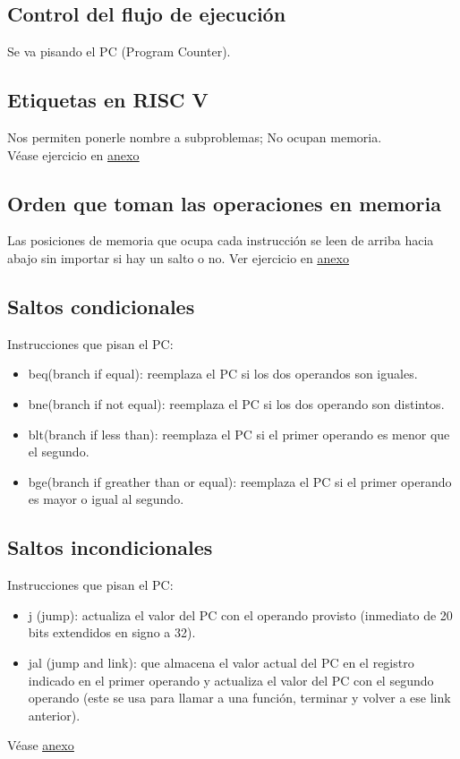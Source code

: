 \documentclass[10pt,a4paper]{article}
\begin{document}
\subsection*{Control del flujo de ejecución}
Se va pisando el PC (Program Counter). 
\subsection*{Etiquetas en RISC V}
Nos permiten ponerle nombre a subproblemas; No ocupan memoria. \\

Véase ejercicio en \hyperref[subsec:ejercicios_con_saltos_condicionales_incondicionales]{\underline{anexo}}
\subsection*{Orden que toman las operaciones en memoria}
Las posiciones de memoria que ocupa cada instrucción se leen de arriba hacia abajo sin importar si hay un salto o no.
Ver ejercicio en \hyperref[subsec:TPRVC]{\underline{anexo}} 
\subsection*{Saltos condicionales}
Instrucciones que pisan el PC: 
\begin{itemize}
    \item beq(branch if equal): reemplaza el PC si los dos operandos son iguales.
    \item bne(branch if not equal): reemplaza el PC si los dos operando son distintos.
    \item blt(branch if less than): reemplaza el PC si el primer operando es menor que el segundo.
    \item bge(branch if greather than or equal): reemplaza el PC si el primer operando es mayor o igual al segundo.
\end{itemize}
\subsection*{Saltos incondicionales}
Instrucciones que pisan el PC: 
\begin{itemize}
    \item j (jump): actualiza el valor del PC con el operando provisto (inmediato de 20 bits extendidos en signo a 32).
    \item jal (jump and link): que almacena el valor actual del PC en el registro indicado en el primer operando y actualiza el valor del PC con el segundo operando (este se usa para llamar a una función, terminar y volver a ese link anterior).
\end{itemize}
Véase \hyperref[subsec:ejercicios_con_saltos_condicionales_incondicionales]{\underline{anexo}}
\end{document}
